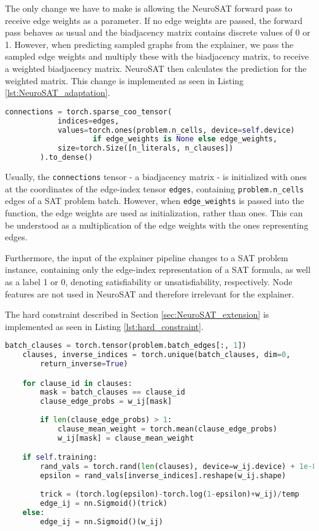 The only change we have to make is allowing the NeuroSAT forward pass to receive edge weights as a parameter. If no edge weights are passed, the forward pass behaves as usual and the biadjacency matrix contains discrete values of 0 or 1. However, when predicting sampled graphs from the explainer, we pass the sampled edge weights and multiply these with the biadjacency matrix, to receive a weighted biadjacency matrix. NeuroSAT then calculates the prediction for the weighted matrix. This change is implemented as seen in Listing \ref{lst:NeuroSAT_adaptation}.
\begin{lstlisting}[language=Python, caption=Adaptation of NeuroSAT., label=lst:NeuroSAT_adaptation]
    connections = torch.sparse_coo_tensor(
            indices=edges,
            values=torch.ones(problem.n_cells, device=self.device) 
                    if edge_weights is None else edge_weights,
            size=torch.Size([n_literals, n_clauses])
        ).to_dense()
\end{lstlisting}
Usually, the \lstinline|connections| tensor - a biadjacency matrix - is initialized with ones at the coordinates of the edge-index tensor \lstinline|edges|, containing \lstinline|problem.n_cells| edges of a SAT problem batch. However, when \lstinline|edge_weights| is passed into the function, the edge weights are used as initialization, rather than ones. This can be understood as a multiplication of the edge weights with the ones representing edges.

Furthermore, the input of the explainer pipeline changes to a SAT problem instance, containing only the edge-index representation of a SAT formula, as well as a label 1 or 0, denoting satisfiability or unsatisfiability, respectively. Node features are not used in NeuroSAT and therefore irrelevant for the explainer. \bigskip

The hard constraint described in Section \ref{sec:NeuroSAT_extension} is implemented as seen in Listing \ref{lst:hard_constraint}.

\begin{lstlisting}[language=Python, caption=Implementation of Hard Constraint., label=lst:hard_constraint]
    batch_clauses = torch.tensor(problem.batch_edges[:, 1])
    clauses, inverse_indices = torch.unique(batch_clauses, dim=0, 
        return_inverse=True)

    for clause_id in clauses:
        mask = batch_clauses == clause_id
        clause_edge_probs = w_ij[mask]
        
        if len(clause_edge_probs) > 1:
            clause_mean_weight = torch.mean(clause_edge_probs)
            w_ij[mask] = clause_mean_weight

    if self.training:
        rand_vals = torch.rand(len(clauses), device=w_ij.device) + 1e-8
        epsilon = rand_vals[inverse_indices].reshape(w_ij.shape)
        
        trick = (torch.log(epsilon)-torch.log(1-epsilon)+w_ij)/temp
        edge_ij = nn.Sigmoid()(trick)    
    else:
        edge_ij = nn.Sigmoid()(w_ij)
\end{lstlisting}

